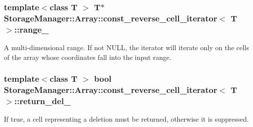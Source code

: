 \subsubsection[{range\+\_\+}]{\setlength{\rightskip}{0pt plus 5cm}template$<$class T $>$ T$\ast$ {\bf Storage\+Manager\+::\+Array\+::const\+\_\+reverse\+\_\+cell\+\_\+iterator}$<$ T $>$\+::range\+\_\+\hspace{0.3cm}{\ttfamily [private]}}\label{classStorageManager_1_1Array_1_1const__reverse__cell__iterator_af6bad4e1e24814785b6ddca558735a24}
A multi-\/dimensional range. If not N\+U\+L\+L, the iterator will iterate only on the cells of the array whose coordinates fall into the input range. \hypertarget{classStorageManager_1_1Array_1_1const__reverse__cell__iterator_a2de3135fe63b39f73d699a79d773828a}{}
\subsubsection[{return\+\_\+del\+\_\+}]{\setlength{\rightskip}{0pt plus 5cm}template$<$class T $>$ bool {\bf Storage\+Manager\+::\+Array\+::const\+\_\+reverse\+\_\+cell\+\_\+iterator}$<$ T $>$\+::return\+\_\+del\+\_\+\hspace{0.3cm}{\ttfamily [private]}}\label{classStorageManager_1_1Array_1_1const__reverse__cell__iterator_a2de3135fe63b39f73d699a79d773828a}
If true, a cell representing a deletion must be returned, otherwise it is suppressed. \hypertarget{classStorageManager_1_1Array_1_1const__reverse__cell__iterator_ad3ec6eabf371f96e8b91d101f8e17675}{}
